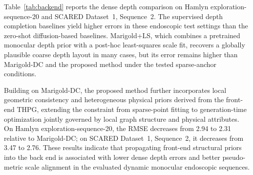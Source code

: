\documentclass[pdflatex,sn-mathphys-num]{sn-jnl}
\begin{document}
\begin{table}[t]
\caption{Cross-dataset comparison of dense depth completion errors.}
\label{tab:backend}
\centering
\small
{}
\end{table}

Table~\ref{tab:backend} reports the dense depth comparison on Hamlyn exploration-sequence-20 and SCARED Dataset~1, Sequence~2. The supervised depth completion baselines yield higher errors in these endoscopic test settings than the zero-shot diffusion-based baselines. Marigold+LS, which combines a pretrained monocular depth prior with a post-hoc least-squares scale fit, recovers a globally plausible coarse depth layout in many cases, but its error remains higher than Marigold-DC and the proposed method under the tested sparse-anchor conditions.

Building on Marigold-DC, the proposed method further incorporates local geometric consistency and heterogeneous physical priors derived from the front-end THPG, extending the constraint from sparse-point fitting to generation-time optimization jointly governed by local graph structure and physical attributes. On Hamlyn exploration-sequence-20, the RMSE decreases from 2.94 to 2.31 relative to Marigold-DC; on SCARED Dataset~1, Sequence~2, it decreases from 3.47 to 2.76. These results indicate that propagating front-end structural priors into the back end is associated with lower dense depth errors and better pseudo-metric scale alignment in the evaluated dynamic monocular endoscopic sequences.
\end{document}
